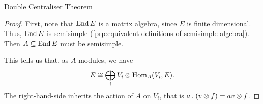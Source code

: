 \begin{thm}{Double Centraliser Theorem}{}
\begin{proof}
        First, note that \(\operatorname{End} E\) is a matrix algebra, since \(E\) is finite dimensional.
        Thus, \(\operatorname{End} E\) is semisimple (\cref{prp:equivalent definitions of semisimple algebra}).
        Then \(A \subseteq \operatorname{End} E\) must be semisimple.
        
        This tells us that, as \(A\)-modules, we have
        \begin{equation}
            E \cong \bigoplus_i V_i \otimes \operatorname{Hom}_A(V_i, E).
        \end{equation}
        The right-hand-side inherits the action of \(A\) on \(V_i\), that is \(a \mathbin{.} (v \otimes f) = av \otimes f\).
        

\end{proof}
\end{thm}
